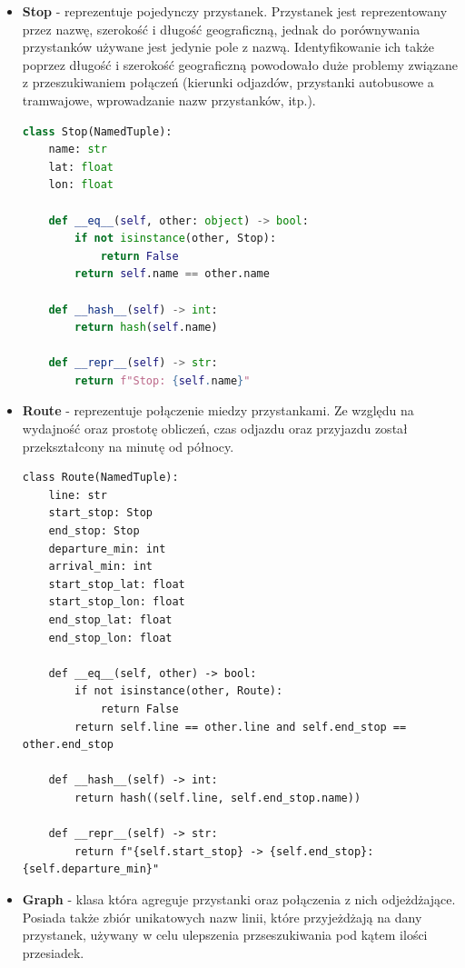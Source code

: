 \documentclass[a4paper, 12pt]{article}
\begin{document}
    \begin{itemize}
      \item \textbf{Stop} - reprezentuje pojedynczy przystanek. 
        Przystanek jest reprezentowany przez nazwę, szerokość i długość geograficzną,
        jednak do porównywania przystanków używane jest jedynie pole z nazwą. Identyfikowanie ich także poprzez
        długość i szerokość geograficzną powodowało duże problemy związane z przeszukiwaniem połączeń (kierunki odjazdów,
        przystanki autobusowe a tramwajowe, wprowadzanie nazw przystanków, itp.).
        \begin{lstlisting}[language=Python]
class Stop(NamedTuple):
    name: str
    lat: float
    lon: float

    def __eq__(self, other: object) -> bool:
        if not isinstance(other, Stop):
            return False
        return self.name == other.name

    def __hash__(self) -> int:
        return hash(self.name)

    def __repr__(self) -> str:
        return f"Stop: {self.name}"
        \end{lstlisting}



      \item \textbf{Route} - reprezentuje połączenie miedzy przystankami. Ze względu na wydajność
      oraz prostotę obliczeń, czas odjazdu oraz przyjazdu został przekształcony na minutę od północy.
\begin{lstlisting}
class Route(NamedTuple):
    line: str
    start_stop: Stop
    end_stop: Stop
    departure_min: int
    arrival_min: int
    start_stop_lat: float
    start_stop_lon: float
    end_stop_lat: float
    end_stop_lon: float

    def __eq__(self, other) -> bool:
        if not isinstance(other, Route):
            return False
        return self.line == other.line and self.end_stop == other.end_stop

    def __hash__(self) -> int:
        return hash((self.line, self.end_stop.name))

    def __repr__(self) -> str:
        return f"{self.start_stop} -> {self.end_stop}: {self.departure_min}"
\end{lstlisting}

      \item \textbf{Graph} - klasa która agreguje przystanki oraz połączenia z nich odjeżdżające. 
      Posiada także zbiór unikatowych nazw linii, które przyjeżdżają na dany przystanek, używany
      w celu ulepszenia przseszukiwania pod kątem ilości przesiadek.
      

\end{itemize}
\end{document}
